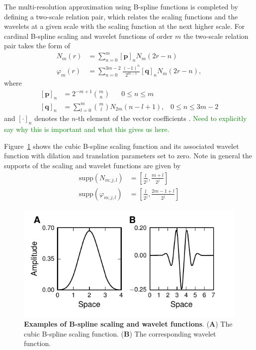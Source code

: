 \documentclass[11pt,draftcls,onecolumn,peerreview]{IEEEtran}
\newcommand{\dean}[1]{\textcolor{green}{#1}}
\begin{document}
The multi-resolution approximation using B-spline functions is completed by defining a two-scale relation pair, which relates the scaling functions and the wavelets at a given scale with the scaling function at the next higher scale. For cardinal B-spline scaling and wavelet functions of order $m$ the two-scale relation pair takes the form of
\begin{align}
 N_{m}\left(r\right)&=\sum_{n=0}^{m} \left[\mathbf p\right]_n N_{m}\left(2r-n\right) \label{eq:MRA-TwoScalepair1} \\
  \varphi_{m}\left(r\right) &= \sum_{n=0}^{3m-2} \frac{\left(-1\right)^n}{2^{m-1}} \left[\mathbf q\right]_n N_{m}\left(2r-n\right)\label{eq:MRA-TwoScalepair2},
 \end{align}
where 
 \begin{align}
\left[\mathbf p\right]_n&=2^{-m+1} \binom{m}{n} \quad \text{ $0\le n\le m$} \label{eq:MRA-TwoScalepair1coefs}\\
\left[\mathbf q\right]_n&= \sum_{l=0}^{m} \binom{m}{l} N_{2m}\left(n-l+1\right), \,  \text{ $0\le n\le 3m-2$}\label{eq:MRA-TwoScalepair2coefs}
 \end{align}
and $\left[\cdot\right]_n$ denotes the $n$-th element of the vector coefficients \cite{Chui1992}. \dean{Need to explicitly say why this is important and what this gives us here.}

Figure~\ref{fig:MRA-Figure1} shows the cubic B-spline scaling function and its associated wavelet function with dilation and translation parameters set to zero. Note in general the supports of the scaling and wavelet functions are given by 
\begin{align}
	\mathrm{supp}(N_{m;j,l})&=\left[\frac{l}{2^j},\frac{m+l}{2^j}\right] \\  
  \mathrm{supp}(\varphi_{m;j,l})&=\left[\frac{l}{2^j},\frac{2m-1+l}{2^j}\right] 
	\end{align} 
\begin{figure}[!t]
\centering
\includegraphics{./Graph/Figure1.pdf}
\caption{{\bf Examples of B-spline scaling and wavelet functions}. (\textbf{A}) The cubic B-spline scaling function. (\textbf{B}) The corresponding wavelet function.}
\label{fig:MRA-Figure1}
\end{figure}
\end{document}

